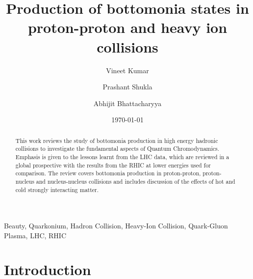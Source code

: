 \documentclass[review]{elsarticle}
\begin{document}
\fontsize{11}{15}
\selectfont

\begin{frontmatter}
  \title{Production of bottomonia states in proton-proton and heavy ion collisions}
  \author[NPD]{Vineet Kumar}
  \author[NPD,HBNI]{Prashant Shukla}
  \author[UOC]{Abhijit Bhattacharyya}
  \address[NPD]{Nuclear Physics Division, Bhabha Atomic Research Centre, Mumbai 400085, India}
  \address[UOC]{Department of Physics, University of Calcutta, 92, A. P. C. Road Kolkata-700009, India}
  \address[HBNI]{Homi Bhabha National Institute, Anushakti Nagar, Mumbai 400094, India}
  \date{\today}
  
  \begin{abstract}
    
    This work reviews the study of bottomonia production in high energy hadronic collisions to investigate
    the fundamental aspects of Quantum Chromodynamics. Emphasis is given to the lessons learnt from the LHC
    data, which are reviewed in a global prospective with the results from the RHIC at lower energies used
    for comparison. The review covers bottomonia production in proton-proton, proton-nucleus and nucleus-nucleus
    collisions and includes discussion of the effects of hot and cold strongly interacting matter.

  \end{abstract}
  
  \begin{keyword}
    Beauty, Quarkonium, Hadron Collision, Heavy-Ion Collision, Quark-Gluon Plasma, LHC, RHIC
  \end{keyword}
  


  

\maketitle

\tableofcontents


\end{frontmatter}





\section{Introduction}
\label{sec:Introduction}
\end{document}
